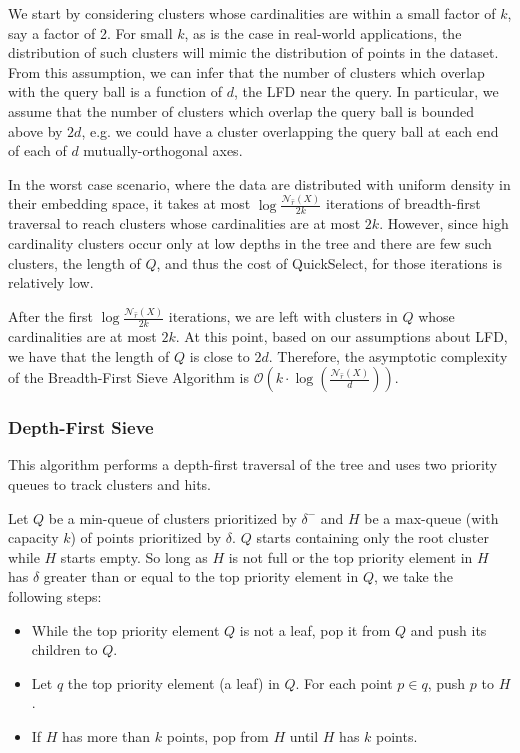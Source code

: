 We start by considering clusters whose cardinalities are within a small factor of $k$, say a factor of 2.
For small $k$, as is the case in real-world applications, the distribution of such clusters will mimic the distribution of points in the dataset.
From this assumption, we can infer that the number of clusters which overlap with the query ball is a function of $d$, the LFD near the query.
In particular, we assume that the number of clusters which overlap the query ball is bounded above by $2d$, e.g. we could have a cluster overlapping the query ball at each end of each of $d$ mutually-orthogonal axes.

In the worst case scenario, where the data are distributed with uniform density in their embedding space, it takes at most $\log{\frac{\mathcal{N}_{\hat{r}}(X)}{2k}}$ iterations of breadth-first traversal to reach clusters whose cardinalities are at most $2k$.
However, since high cardinality clusters occur only at low depths in the tree and there are few such clusters, the length of $Q$, and thus the cost of QuickSelect, for those iterations is relatively low.

After the first $\log{\frac{\mathcal{N}_{\hat{r}}(X)}{2k}}$ iterations, we are left with clusters in $Q$ whose cardinalities are at most $2k$.
At this point, based on our assumptions about LFD, we have that the length of $Q$ is close to $2d$.
Therefore, the asymptotic complexity of the Breadth-First Sieve Algorithm is $\mathcal{O} \left( k \cdot \log(\frac{\mathcal{N}_{\hat{r}}(X)}{d}) \right)$.


\subsubsection{Depth-First Sieve}
\label{sec:methods:knn-search:depth-first-sieve}

This algorithm performs a depth-first traversal of the tree and uses two priority queues to track clusters and hits.

Let $Q$ be a min-queue of clusters prioritized by $\delta^{-}$ and $H$ be a max-queue (with capacity $k$) of points prioritized by $\delta$.
$Q$ starts containing only the root cluster while $H$ starts empty.
So long as $H$ is not full or the top priority element in $H$ has $\delta$ greater than or equal to the top priority element in $Q$, we take the following steps:

\begin{itemize}
    \item While the top priority element $Q$ is not a leaf, pop it from $Q$ and push its children to $Q$.
    \item Let $q$ the top priority element (a leaf) in $Q$. For each point $p \in q$, push $p$ to $H$.
    \item If $H$ has more than $k$ points, pop from $H$ until $H$ has $k$ points.
\end{itemize}

